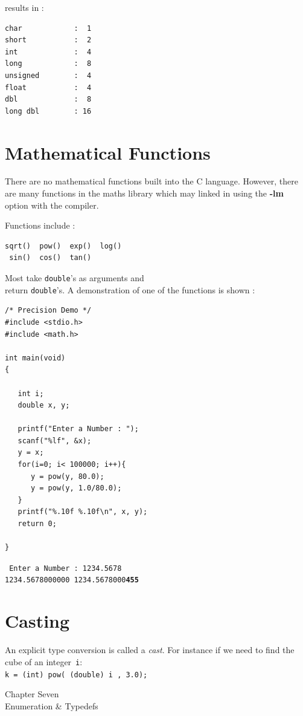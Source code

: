 \documentclass[a4,portraitt]{slides}
\begin{document}
results in :
{\small
\begin{verbatim}
char            :  1
short           :  2
int             :  4
long            :  8
unsigned        :  4
float           :  4
dbl             :  8
long dbl        : 16
\end{verbatim}
}

\newpage
\section*{Mathematical Functions}

There are no mathematical functions built into the C language.
However, there are many functions in the maths library
which may linked in using the \textbf{-lm} option with the compiler.

Functions include :
\begin{verbatim}
sqrt()  pow()  exp()  log()
 sin()  cos()  tan()
\end{verbatim}
Most take {\tt double}'s as arguments and\\ return {\tt double}'s.
A demonstration of one of the functions is shown :
\newpage
\begin{verbatim}
/* Precision Demo */
#include <stdio.h>
#include <math.h>

int main(void)
{

   int i;
   double x, y;

   printf("Enter a Number : ");
   scanf("%lf", &x);
   y = x;
   for(i=0; i< 100000; i++){
      y = pow(y, 80.0);
      y = pow(y, 1.0/80.0);
   }
   printf("%.10f %.10f\n", x, y);
   return 0;

}
\end{verbatim}
{\tt
Enter a Number : 1234.5678\\
1234.5678000000 1234.5678000{\bf 455}
}

\section*{Casting}

An explicit type conversion is called a {\it cast}.
For instance if we need to find the cube of an integer~\verb^i^:\\
\verb^k = (int) pow( (double) i , 3.0);^

\newpage
\begin{center}
{\Large Chapter Seven \\ Enumeration \& Typedefs}
\end{center}
\end{document}
